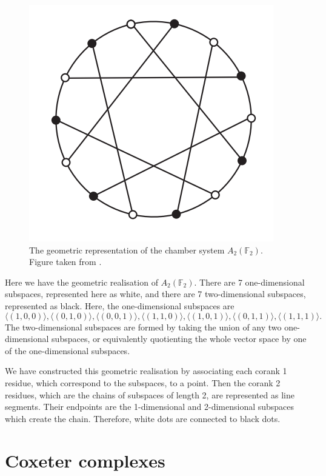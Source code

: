 \documentclass[11pt]{article}
\begin{document}
\begin{figure}[!htbp]
    \centering
        \includegraphics[scale=0.5]{Screenshot 2023-03-16 131651.png}
        \caption{The geometric representation of the chamber system $A_2(\mathbb{F}_2)$. Figure taken from \cite[p.2]{EVERITT}.}
\end{figure}



\begin{example} \label{AnK}
    Here we have the geometric realisation of $A_2(\mathbb{F}_2)$. There are 7 one-dimensional subspaces, represented here as white, and there are 7 two-dimensional subspaces, represented as black. Here, the one-dimensional subspaces are
    \[\langle (1,0,0)\rangle, \langle (0,1,0)\rangle,\langle (0,0,1)\rangle,\langle (1,1,0)\rangle,\langle (1,0,1)\rangle,\langle (0,1,1)\rangle,\langle (1,1,1)\rangle.\]
    The two-dimensional subspaces are formed by taking the union of any two one-dimensional subspaces, or equivalently quotienting the whole vector space by one of the one-dimensional subspaces. 

    We have constructed this geometric realisation by associating each corank 1 residue, which correspond to the subspaces, to a point. Then the corank 2 residues, which are the chains of subspaces of length 2, are represented as line segments. Their endpoints are the 1-dimensional and 2-dimensional subspaces which create the chain. Therefore, white dots are connected to black dots.
\end{example}

\section{Coxeter complexes} \label{3}
\end{document}
